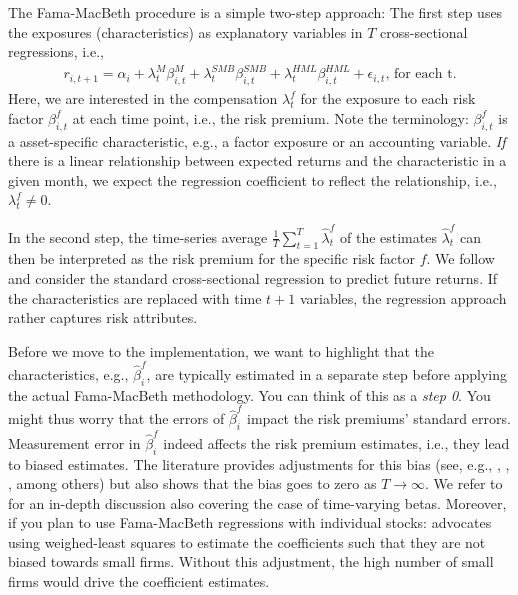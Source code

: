 \documentclass[
]{book}
\begin{document}
The Fama-MacBeth procedure is a simple two-step approach:
The first step uses the exposures (characteristics) as explanatory variables in \(T\) cross-sectional regressions, i.e.,
\[\begin{aligned}r_{i,t+1} = \alpha_i + \lambda^{M}_t \beta^M_{i,t}  + \lambda^{SMB}_t \beta^{SMB}_{i,t} + \lambda^{HML}_t \beta^{HML}_{i,t} + \epsilon_{i,t}\text{, for each t}.\end{aligned}\]
Here, we are interested in the compensation \(\lambda^{f}_t\) for the exposure to each risk factor \(\beta^{f}_{i,t}\) at each time point, i.e., the risk premium. Note the terminology: \(\beta^{f}_{i,t}\) is a asset-specific characteristic, e.g., a factor exposure or an accounting variable. \emph{If} there is a linear relationship between expected returns and the characteristic in a given month, we expect the regression coefficient to reflect the relationship, i.e., \(\lambda_t^{f}\neq0\).

In the second step, the time-series average \(\frac{1}{T}\sum\limits_{t=1}^T \hat\lambda^{f}_t\) of the estimates \(\hat\lambda^{f}_t\) can then be interpreted as the risk premium for the specific risk factor \(f\). We follow \citet{Zaffaroni2022} and consider the standard cross-sectional regression to predict future returns. If the characteristics are replaced with time \(t+1\) variables, the regression approach rather captures risk attributes.

Before we move to the implementation, we want to highlight that the characteristics, e.g., \(\hat\beta^{f}_{i}\), are typically estimated in a separate step before applying the actual Fama-MacBeth methodology. You can think of this as a \emph{step 0}. You might thus worry that the errors of \(\hat\beta^{f}_{i}\) impact the risk premiums' standard errors. Measurement error in \(\hat\beta^{f}_{i}\) indeed affects the risk premium estimates, i.e., they lead to biased estimates. The literature provides adjustments for this bias (see, e.g., \citet{Shanken1992}, \citet{Kim1995}, \citet{Chen2015}, among others) but also shows that the bias goes to zero as \(T \to \infty\). We refer to \citet{Gagliardini2016} for an in-depth discussion also covering the case of time-varying betas. Moreover, if you plan to use Fama-MacBeth regressions with individual stocks: \citet{Hou2020} advocates using weighed-least squares to estimate the coefficients such that they are not biased towards small firms. Without this adjustment, the high number of small firms would drive the coefficient estimates.
\end{document}
